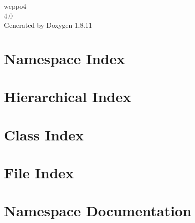 \documentclass[twoside]{book}
\newcommand{\+}{\discretionary{\mbox{\scriptsize$\hookleftarrow$}}{}{}}
\newcommand{\clearemptydoublepage}{%
  \newpage{\pagestyle{empty}\cleardoublepage}%
}
\begin{document}
\hypersetup{pageanchor=false,
             bookmarksnumbered=true,
             pdfencoding=unicode
            }
\begin{titlepage}
\vspace*{7cm}
\begin{center}%
{\Large weppo4 \\[1ex]\large 4.\+0 }\\
\vspace*{1cm}
{\large Generated by Doxygen 1.8.11}\\
\end{center}
\end{titlepage}
\clearemptydoublepage
\tableofcontents
\clearemptydoublepage
{}
\hypersetup{pageanchor=true}

\chapter{Namespace Index}

\chapter{Hierarchical Index}

\chapter{Class Index}

\chapter{File Index}

\chapter{Namespace Documentation}







\end{document}
